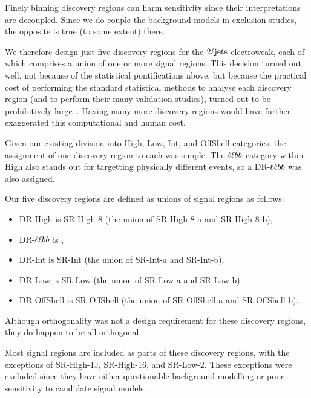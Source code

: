 Finely binning discovery regions can harm sensitivity since their
interpretations are decoupled.
Since we do couple the background models in exclusion studies,
the opposite is true (to some extent) there.

We therefore design just five discovery regions for the
$2\ell\mathrm{jets}$-electroweak, each of which comprises a union of one or more
signal regions.
This decision turned out well, not because of the statistical pontifications
above, but because the practical cost of performing the standard statistical
methods to analyse each discovery region (and to perform their many validation
studies), turned out to be prohibitively large~\cite{verkerke2003roofit}.
Having many more discovery regions would have further exaggerated this
computational and human cost.

Given our existing division into High, Low, Int, and OffShell
categories, the assignment of one discovery region to each was simple.
The $\ell\ell bb$ category within High also stands out for targetting physically
different events, so a DR-$\ell\ell bb$ was also assigned.

Our five discovery regions are defined as unions of signal regions as follows:
\begin{itemize}
\item DR-High is SR-High-8 (the union of SR-High-8-a and SR-High-8-b),
\item DR-$\ell\ell bb$ is \srllbb,
\item DR-Int is SR-Int (the union of SR-Int-a and SR-Int-b),
\item DR-Low is SR-Low (the union of SR-Low-a and SR-Low-b)
\item DR-OffShell is SR-OffShell (the union of SR-OffShell-a and SR-OffShell-b).
\end{itemize}
Although orthogonality was not a design requirement for these discovery
regions, they do happen to be all orthogonal.

Most signal regions are included as parts of these discovery regions, with the
exceptions of SR-High-1J, SR-High-16, and SR-Low-2.
These exceptions were excluded since they have either questionable background
modelling or poor sensitivity to candidate signal models.

